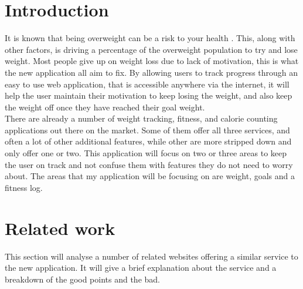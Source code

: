\section{Introduction}
It is known that being overweight can be a risk to your health \citep{theordre:1985}. This, along with other factors, is driving a percentage of the overweight population to try and lose weight. Most people give up on weight loss due to lack of motivation, this is what the new application all aim to fix. By allowing users to track progress through an easy to use web application, that is accessible anywhere via the internet, it will help the user maintain their motivation to keep losing the weight, and also keep the weight off once they have reached their goal weight.\\

There are already a number of weight tracking, fitness, and calorie counting applications out there on the market. Some of them offer all three services, and often a lot of other additional features, while other are more stripped down and only offer one or two. This application will focus on two or three areas to keep the user on track and not confuse them with features they do not need to worry about. The areas that my application will be focusing on are weight, goals and a fitness log.

\section{Related work}
This section will analyse a number of related websites offering a similar service to the new application. It will give a brief explanation about the service and a breakdown of the good points and the bad.

